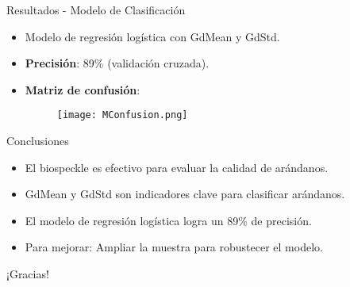 \documentclass{beamer}
\begin{document}
\begin{frame}{Resultados - Modelo de Clasificación}
    \begin{itemize}
        \item Modelo de regresión logística con GdMean y GdStd.
        \item \textbf{Precisión}: 89\% (validación cruzada).
        \item \textbf{Matriz de confusión}:
        \begin{figure}
            \texttt{[image: MConfusion.png]}
        \end{figure}
    \end{itemize}
\end{frame}

\begin{frame}{Conclusiones}
    \begin{itemize}
        \item El biospeckle es efectivo para evaluar la calidad de arándanos.
        \item GdMean y GdStd son indicadores clave para clasificar arándanos.
        \item El modelo de regresión logística logra un 89\% de precisión.
        \item Para mejorar: Ampliar la muestra para robustecer el modelo.
    \end{itemize}
\end{frame}

\begin{frame}
    \centering
    \Huge{¡Gracias!}
\end{frame}
\end{document}

